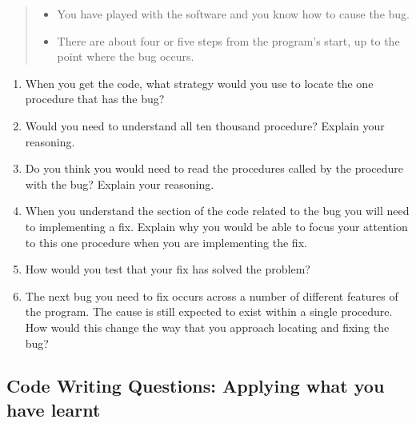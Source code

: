 \begin{enumerate}
\begin{quote}
\begin{itemize}
      \item You have played with the software and you know how to cause the bug.
      \item There are about four or five steps from the program's start, up to the point where the bug occurs.    
    \end{itemize}
  \end{quote}
  \begin{enumerate}
    \item When you get the code, what strategy would you use to locate the one procedure that has the bug?
    \item Would you need to understand all ten thousand procedure? Explain your reasoning.
    \item Do you think you would need to read the procedures called by the procedure with the bug? Explain your reasoning.
    \item When you understand the section of the code related to the bug you will need to implementing a fix. Explain why you would be able to focus your attention to this one procedure when you are implementing the fix.
    \item How would you test that your fix has solved the problem?
    \item The next bug you need to fix occurs across a number of different features of the program. The cause is still expected to exist within a single procedure. How would this change the way that you approach locating and fixing the bug?
  \end{enumerate}
  
\end{enumerate}

\clearpage
\subsection{Code Writing Questions: Applying what you have learnt} %
\label{sub:code_writing_questions_applying_what_you_have_learnt_proc}

